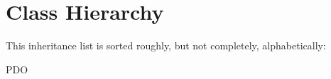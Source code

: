 \section{Class Hierarchy}
This inheritance list is sorted roughly, but not completely, alphabetically\+:\begin{DoxyCompactList}
\item {}
\item P\+DO\begin{DoxyCompactList}
\item {}
\end{DoxyCompactList}
\end{DoxyCompactList}
